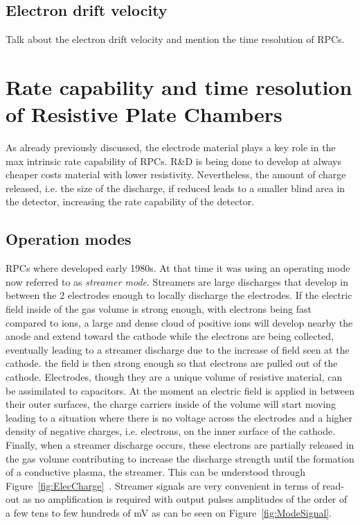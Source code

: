 	\subsection{Electron drift velocity}
	\label{chapt3:ssec:drift}
	
	{\color{blue} Talk about the electron drift velocity and mention the time resolution of RPCs.}
	

\section{Rate capability and time resolution of Resistive Plate Chambers}
\label{sec:RateCapa}

	As already previously discussed, the electrode material plays a key role in the max intrinsic rate capability of RPCs. R\&D is being done to develop at always cheaper costs material with lower resistivity. Nevertheless, the amount of charge released, i.e. the size of the discharge, if reduced leads to a smaller blind area in the detector, increasing the rate capability of the detector.
	
	\subsection{Operation modes}
	\label{chapt3:ssec:operation}
	
	RPCs where developed early 1980s. At that time it was using an operating mode now referred to as \textit{streamer mode}. Streamers are large discharges that develop in between the 2 electrodes enough to locally discharge the electrodes. If the electric field inside of the gas volume is strong enough, with electrons being fast compared to ions, a large and dense cloud of positive ions will develop nearby the anode and extend toward the cathode while the electrons are being collected, eventually leading to a streamer discharge due to the increase of field seen at the cathode. the field is then strong enough so that electrons are pulled out of the cathode. Electrodes, though they are a unique volume of resistive material, can be assimilated to capacitors. At the moment an electric field is applied in between their outer surfaces, the charge carriers inside of the volume will start moving leading to a situation where there is no voltage across the electrodes and a higher density of negative charges, i.e. electrons, on the inner surface of the cathode. Finally, when a streamer discharge occurs, these electrons are partially released in the gas volume contributing to increase the discharge strength until the formation of a conductive plasma, the streamer. This can be understood through Figure~\ref{fig:ElecCharge}~\cite{CROTTY93}. Streamer signals are very convenient in terms of read-out as no amplification is required with output pulses amplitudes of the order of a few tens to few hundreds of \si{mV} as can be seen on Figure~\ref{fig:ModeSignal}.
	
